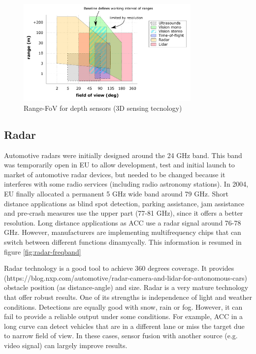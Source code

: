 \begin{figure}[h]
    \centering
    \includegraphics[width=0.8\textwidth]{"img/plot_range-fov"}
    \caption{Range-FoV for depth sensors (3D sensing tecnology)}
    \label{fig:range-fov}
\end{figure}

\subsection{Radar}

Automotive radars were initially designed around the 24 GHz band. This band was temporarily open in EU to allow development, test and initial launch to market of
automotive radar devices, but needed to be changed because it interferes with some radio services (including radio astronomy stations).
In 2004, EU finally allocated a permanent 5 GHz wide band around 79 GHz. Short 
distance applications as blind spot detection, parking assistance, jam 
assistance and pre-crash measures use the upper part (77-81 GHz), since it 
offers a better resolution. Long distance applications as ACC use a radar 
signal around 76-78 GHz. However, manufacturers are implementing multifrequency 
chips that can switch between different functions dinamycally.
This information is resumed in figure \ref{fig:radar-freqband}

Radar technology is a good tool to achieve 360 degrees coverage. It provides 
(https://blog.nxp.com/automotive/radar-camera-and-lidar-for-autonomous-cars)
obstacle position (as distance-angle) and size.
Radar is a very mature technology that offer robust results. One of its strengths is
independence of light and weather conditions. Detections are equally good with snow, rain or fog.
However, it can fail to provide a reliable output under some conditions. For example, ACC in a long curve can detect vehicles that are in a different lane or miss the target due to narrow field of view. In these cases, sensor fusion with another source (e.g. video signal) can largely improve results.

